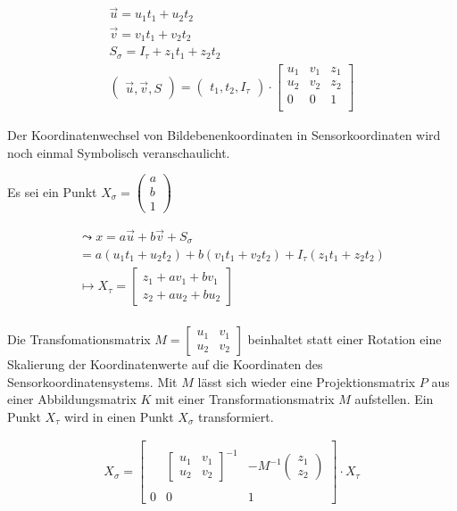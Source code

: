 		\begin{gather}
		\vec{u} = u_1 t_1 + u_2 t_2\\
		\vec{v} = v_1 t_1 + v_2 t_2\\
		S_\sigma = I_\tau +z_1 t_1 + z_2 t_2\\
		\begin{pmatrix}
		\vec{u}, \vec{v}, S
		\end{pmatrix}		
		=
		\begin{pmatrix}
		t_1, t_2, I_\tau
		\end{pmatrix}\cdot	
		\begin{bmatrix}
		u_1&v_1&z_1\\u_2&v_2&z_2\\0&0&1\\
		\end{bmatrix}
		\end{gather}
		
		Der Koordinatenwechsel von Bildebenenkoordinaten in Sensorkoordinaten wird noch einmal Symbolisch veranschaulicht.	 
		
		Es sei ein Punkt $X_\sigma=\begin{pmatrix}
		a\\b\\1
		\end{pmatrix}$
		
		\begin{gather}
		\leadsto x = a \vec{u} + b \vec{v} + S_\sigma\\
		= a (u_1 t_1 + u_2 t_2) +b(v_1 t_1 + v_2 t_2) + I_\tau(z_1 t_1+z_2 t_2)\\
		\mapsto X_\tau = \begin{bmatrix}
		z_1 + a v_1 + b v_1\\
		z_2 + a u_2 + b u_2
		\end{bmatrix}\\
	\end{gather}

Die Transfomationsmatrix $M = \begin{bmatrix}
	u_1& v_1\\
	u_2& v_2
\end{bmatrix}$ beinhaltet statt einer Rotation eine Skalierung der Koordinatenwerte auf die Koordinaten des Sensorkoordinatensystems. Mit $M$ lässt sich wieder eine Projektionsmatrix $P$ aus einer Abbildungsmatrix $K$ mit einer Transformationsmatrix $M$ aufstellen. Ein Punkt $X_\tau$ wird in einen Punkt $X_\sigma$ transformiert.
	
		\begin{gather}
		X_\sigma =
		\begin{bmatrix}
		&  & \\
		&\begin{bmatrix}
		u_1& v_1\\
		u_2& v_2
		\end{bmatrix}^{-1}  & -M^{-1}\begin{pmatrix}
		z_1\\z_2
		\end{pmatrix} \\ 
		&  & \\
		0&0 & 1
		\end{bmatrix}
		\cdot
		X_\tau	
		\end{gather}\\
		
